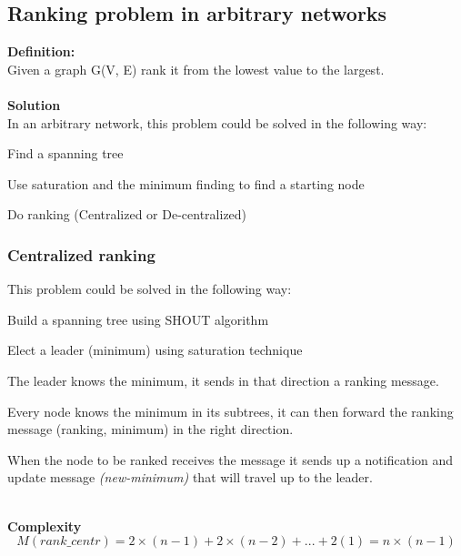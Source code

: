 \documentclass[paper=a4, fontsize=11pt]{scrartcl} %
\numberwithin{equation}{section} %
\numberwithin{figure}{section} %
\numberwithin{table}{section} %
\begin{document}
\subsection*{Ranking problem in arbitrary networks}
\textbf{Definition:} \\Given a graph G(V, E) rank it from the lowest value to the largest.\\ ~ \\
\textbf{Solution}\\In an arbitrary network, this problem could be solved in the following way:
\begin{compactitem}
\item Find a spanning tree
\item Use saturation and the minimum finding to find a starting node
\item Do ranking (Centralized or De-centralized)
\end{compactitem}
\subsubsection*{Centralized ranking}
This problem could be solved in the following way:
\begin{compactitem}
\item Build a spanning tree using SHOUT algorithm
\item Elect a leader (minimum) using saturation technique
\item The leader knows the minimum, it sends in that direction a ranking message.
\item Every node knows the minimum in its subtrees, it can then forward the ranking message (ranking, minimum) in the right direction.
\item When the node to be ranked receives the message it sends up a notification and update message \textit{(new-minimum)} that will travel up to the leader.
\end{compactitem}
~ \\
\textbf{Complexity}
$$M(rank\_centr) = 2\times(n-1)+ 2\times(n-2)+ ... + 2(1)= n\times(n-1)$$ 
\clearpage
\end{document}
